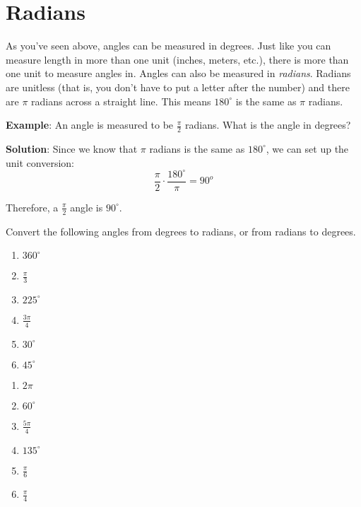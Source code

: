 \section{Radians}
As you've seen above, angles can be measured in degrees. Just like you can 
measure length in more than one unit (inches, meters, etc.), there is more 
than one unit to measure angles in. Angles can also be measured in \textit{
radians}. Radians are unitless (that is, you don't have to put 
a letter after the number) and there are $\pi$ radians across a straight line. 
This means $180^\circ$ is the same as $\pi$ radians. 

\textbf{Example}: An angle is measured to be $\frac{\pi}{2}$ radians. What is 
the angle in degrees?

\textbf{Solution}: Since we know that $\pi$ radians is the same as $180^\circ$,
we can set up the unit conversion:
$$\frac{\pi}{2} \cdot \frac{180^\circ}{\pi} = 90^o$$

Therefore, a $\frac{\pi}{2}$ angle is $90^\circ$. 

\begin{Exercise}[label = radians]
Convert the following angles from degrees to radians, or from radians to degrees. 
\begin{enumerate}
\item $360^\circ$
\item $\frac{\pi}{3}$
\item $225^\circ$
\item $\frac{3\pi}{4}$
\item $30^\circ$
\item $45^\circ$
\end{enumerate}
\end{Exercise}

\begin{Answer}[ref = radians]
\begin{enumerate}
\item $2\pi$
\item $60^\circ$
\item $\frac{5\pi}{4}$
\item $135^\circ$
\item $\frac{\pi}{6}$
\item $\frac{\pi}{4}$
\end{enumerate}
\end{Answer}



